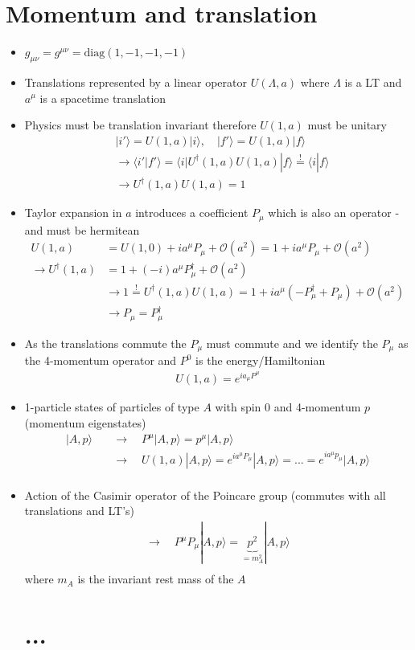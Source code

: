 \documentclass[10pt,a4paper]{book}
\theoremstyle{definition}
\begin{document}
\section{Momentum and translation}
\begin{itemize}
\item $g_{\mu\nu}=g^{\mu\nu}=\text{diag}(1,-1,-1,-1)$
\item Translations represented by a linear operator $U(\Lambda,a)$ where $\Lambda$ is a LT and $a^\mu$ is a spacetime translation
\item Physics must be translation invariant therefore $U(1,a)$ must be unitary
\begin{align}
&|i'\rangle=U(1,a)|i\rangle,\quad
|f'\rangle=U(1,a)|f\rangle\\
&\rightarrow\langle i'|f'\rangle=\langle i|U^\dagger(1,a)U(1,a)|f\rangle\overset{!}{=}\langle i|f\rangle\\
&\rightarrow U^\dagger(1,a)U(1,a)=1
\end{align}
\item Taylor expansion in $a$ introduces a coefficient $P_\mu$ which is also an operator - and must be hermitean 
\begin{align}
U(1,a)&=U(1,0)+ia^\mu P_\mu+\mathcal{O}(a^2)=1+ia^\mu P_\mu+\mathcal{O}(a^2)\\
\rightarrow U^\dagger(1,a)&=1+(-i)a^\mu P_\mu^\dagger+\mathcal{O}(a^2)\\
&\rightarrow 1\overset{!}{=}U^\dagger(1,a)U(1,a)=1+ia^\mu(-P_\mu^\dagger+P_\mu)+\mathcal{O}(a^2)\\
&\rightarrow P_\mu=P_\mu^\dagger
\end{align}
\item As the translations commute the $P_\mu$ must commute and we identify the $P_\mu$ as the 4-momentum operator and $P^0$ is the energy/Hamiltonian
\begin{align}
U(1,a)=e^{ia_\mu P^\mu}
\end{align}
\item 1-particle states of particles of type $A$ with spin 0 and 4-momentum $p$ (momentum eigenstates)
\begin{align}
|A,p\rangle\quad
&\rightarrow\quad P^\mu |A,p\rangle=p^\mu|A,p\rangle\\
&\rightarrow\quad U(1,a) |A,p\rangle=e^{ia^\mu P_\mu}|A,p\rangle=...=e^{ia^\mu p_\mu}|A,p\rangle\\
\end{align}
\item Action of the Casimir operator of the Poincare group (commutes with all translations and LT's)
\begin{align}
\rightarrow\quad P^\mu P_\mu |A,p\rangle=\underbrace{p^2}_{=m_A^2}|A,p\rangle\\
\end{align}
where $m_A$ is the invariant rest mass of the $A$




\section{...}

\end{itemize}
\end{document}

